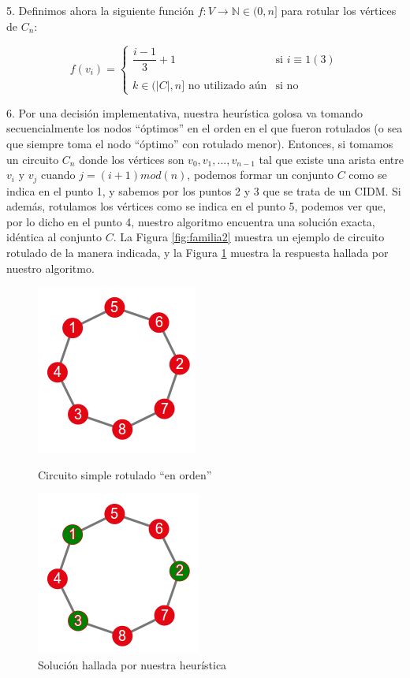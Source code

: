 5. Definimos ahora la siguiente función $f:V \rightarrow \mathbb{N} \in (0,n]$ para rotular los vértices de $C_n$:

\begin{equation*}
f(v_i) = \begin{cases}
\dfrac{i-1}{3}+1 & \text{si } i \equiv 1 (3)\\\\
k \in (|C|,n] \text{ no utilizado aún} & \text{si no}
\end{cases}
\end{equation*}

6. Por una decisión implementativa, nuestra heurística golosa va tomando secuencialmente los nodos ``óptimos'' en el orden en el que fueron rotulados (o sea que siempre toma el nodo ``óptimo'' con rotulado menor). Entonces, si tomamos un circuito $C_n$ donde los vértices son $v_0,v_1,...,v_{n-1}$ tal que existe una arista entre $v_i$ y $v_j$ cuando $j = (i+1) mod (n)$, podemos formar un conjunto $C$ como se indica en el punto 1, y sabemos por los puntos 2 y 3 que se trata de un CIDM.  Si además, rotulamos los vértices como se indica en el punto 5, podemos ver que, por lo dicho en el punto 4, nuestro algoritmo encuentra una solución exacta, idéntica al conjunto $C$. La Figura \ref{fig:familia2} muestra un ejemplo de circuito rotulado de la manera indicada, y la Figura \ref{fig:familia2res} muestra la respuesta hallada por nuestro algoritmo.

\begin{figure}[!htb]
\begin{center}
  \includegraphics[scale=0.8]{imagenes/faimilia2.png}
\end{center}
  \caption{Circuito simple rotulado ``en orden''}\label{fig:familia2}
\endminipage\hfill
{}
\begin{center}
  \includegraphics[scale=0.8]{imagenes/faimilia2-resopt.png}
\end{center}
  \caption{Solución hallada por nuestra heurística}\label{fig:familia2res}
\endminipage
\end{figure}


